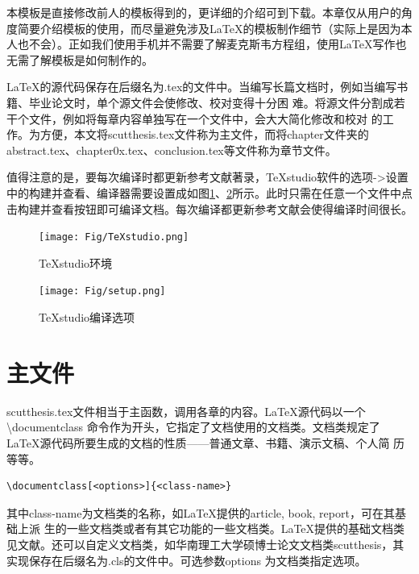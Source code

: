 本模板是直接修改前人的模板得到的，更详细的介绍可到\parencite{_,_a}下载。本章仅从用户的角度简要介绍模板的使用，而尽量避免涉及\LaTeX{}的模板制作细节（实际上是因为本人也不会）。正如我们使用手机并不需要了解麦克斯韦方程组，使用\LaTeX{}写作也无需了解模板是如何制作的。

\LaTeX{}的源代码保存在后缀名为.tex的文件中。当编写长篇文档时，例如当编写书籍、毕业论文时，单个源文件会使修改、校对变得十分困
难。将源文件分割成若干个文件，例如将每章内容单独写在一个文件中，会大大简化修改和校对
的工作。为方便，本文将scutthesis.tex文件称为主文件，而将chapter文件夹的abstract.tex、chapter0x.tex、conclusion.tex等文件称为章节文件。

值得注意的是，要每次编译时都更新参考文献著录，TeXstudio软件的选项->设置中的构建并查看、编译器需要设置成如图\ref{TeXstudio}、\ref{setup}所示。此时只需在任意一个文件中点击构建并查看按钮即可编译文档。每次编译都更新参考文献会使得编译时间很长。
\begin{figure}[htbp]
	\centering
	\texttt{[image: Fig/TeXstudio.png]}
	\caption{\label{TeXstudio}TeXstudio环境}
\end{figure}
\begin{figure}[htbp]
	\centering
	\texttt{[image: Fig/setup.png]}
	\caption{\label{setup}TeXstudio编译选项}
\end{figure}

\section{主文件}
scutthesis.tex文件相当于主函数，调用各章的内容。\LaTeX{}源代码以一个\textbackslash{}documentclass 命令作为开头，它指定了文档使用的文档类。文档类规定了\LaTeX{}源代码所要生成的文档的性质——普通文章、书籍、演示文稿、个人简
历等等。
\begin{lstlisting}
\documentclass[<options>]{<class-name>}
\end{lstlisting}
其中class-name为文档类的名称，如\LaTeX{}提供的article, book, report，可在其基础上派
生的一些文档类或者有其它功能的一些文档类。\LaTeX{}提供的基础文档类见文献\parencite{_c}。还可以自定义文档类，如华南理工大学硕博士论文文档类scutthesis，其实现保存在后缀名为.cls的文件中。可选参数options 为文档类指定选项。


